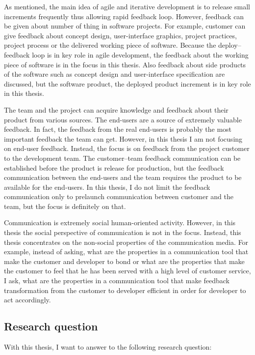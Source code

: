 \documentclass[english,12pt,a4paper,pdftex]{article}
\begin{document}
As mentioned, the main idea of agile and iterative development is to release small increments frequently thus allowing rapid feedback loop. However, feedback can be given about number of thing in software projects. For example, customer can give feedback about concept design, user-interface graphics, project practices, project process or the delivered working piece of software. Because the deploy--feedback loop is in key role in agile development, the feedback about the working piece of software is in the focus in this thesis. Also feedback about side products of the software such as concept design and user-interface specification are discussed, but the software product, the deployed product increment is in key role in this thesis.

The team and the project can acquire knowledge and feedback about their product from various sources. The end-users are a source of extremely valuable feedback. In fact, the feedback from the real end-users is probably the most important feedback the team can get. However, in this thesis I am not focusing on end-user feedback. Instead, the focus is on feedback from the project customer to the development team. The customer--team feedback communication can be established before the product is release for production, but the feedback communication between the end-users and the team requires the product to be available for the end-users. In this thesis, I do not limit the feedback communication only to prelaunch communication between customer and the team, but the focus is definitely on that.

Communication is extremely social human-oriented activity. However, in this thesis the social perspective of communication is not in the focus. Instead, this thesis concentrates on the non-social properties of the communication media. For example, instead of asking, what are the properties in a communication tool that make the customer and developer to bond or what are the properties that make the customer to feel that he has been served with a high level of customer service, I ask, what are the properties in a communication tool that make feedback transformation from the customer to developer efficient in order for developer to act accordingly.

\subsection{Research question}

With this thesis, I want to answer to the following research question:
\end{document}
